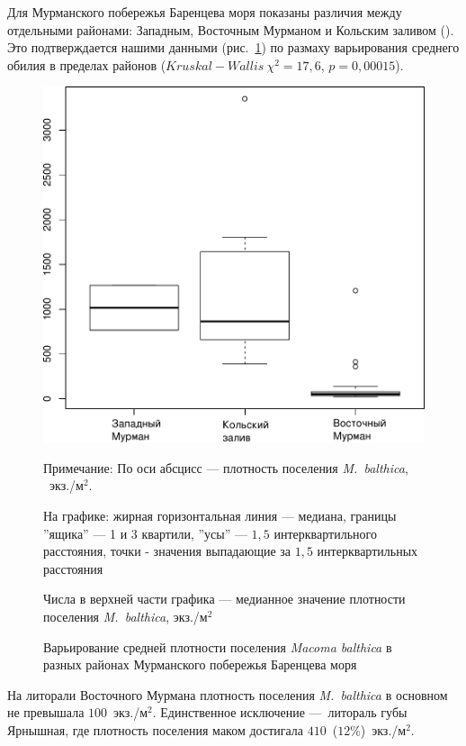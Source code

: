 Для Мурманского побережья Баренцева моря показаны различия между отдельными районами: Западным, Восточным Мурманом и Кольским заливом (\cite{Guryanova_Ushakov_1929, Guryanova_et_al_1930}). 
Это подтверждается нашими данными (рис.~\ref{ris:N_region_Barents}) по размаху варьирования среднего обилия в пределах районов ($Kruskal-Wallis\ \chi^2 = 17,6$, $p = 0,00015$).
%
	\begin{figure}[p]
	\begin{center}
		\includegraphics[height=0.5\textheight]{../All_N/Nmean_region_Barents1.pdf}
	\end{center}
	\caption{Варьирование средней плотности поселения {\it Macoma balthica} в разных районах Мурманского побережья Баренцева моря}
	{\footnotesize Примечание: По оси абсцисс --- плотность поселения {\it M.~balthica}, ~экз./м$^2$.

	На графике: жирная горизонтальная линия --- медиана, границы ''ящика'' --- 1 и 3 квартили, ''усы'' --- $1,5$ интерквартильного расстояния, точки - значения выпадающие за $1,5$ интерквартильных расстояния

Числа в верхней части графика --- медианное значение плотности поселения {\it M.~balthica}, экз./м$^2$}
	\label{ris:N_region_Barents}
	\end{figure}
%
На литорали Восточного Мурмана плотность поселения {\it M.~balthica} в основном не превышала $100$~экз./м$^2$. 
Единственное исключение ---\ литораль губы Ярнышная, где плотность поселения маком достигала $410$~($12$\%)~экз./м$^2$. 
